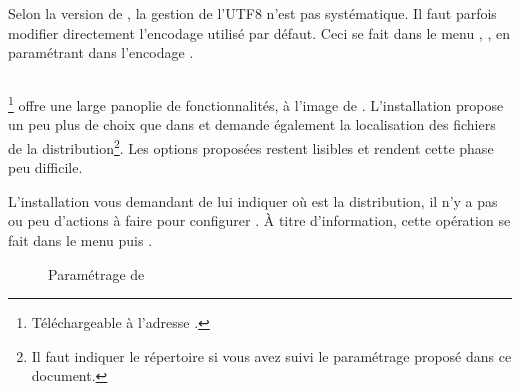 Selon la version de , la gestion de l'UTF8 n'est pas systématique. Il faut parfois modifier directement l'encodage utilisé par défaut. Ceci se fait dans le menu , ,  en paramétrant dans l'encodage .

\subsection{}

\footnote{Téléchargeable à l'adresse .} offre une large panoplie de fonctionnalités, à l'image de . L'installation propose un peu plus de choix que dans  et demande également la localisation des fichiers de la distribution\footnote{Il faut indiquer le répertoire  si vous avez suivi le paramétrage proposé dans ce document.}. Les options proposées restent lisibles et rendent cette phase peu difficile. 

L'installation vous demandant de lui indiquer où est la distribution, il n'y a pas ou peu d'actions à faire pour configurer . \`{A} titre d'information,  cette opération se fait dans le menu  puis . 

\begin{figure}[H]
\centering
{}
\caption{Paramétrage de }
\end{figure}